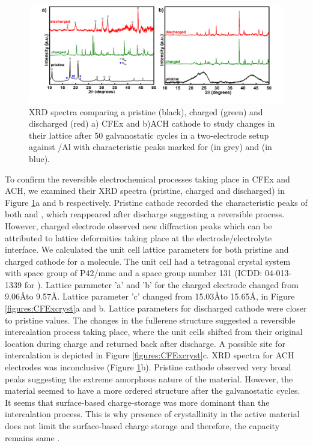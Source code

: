 \documentclass{article}
\begin{document}
\begin{figure}[tbh!]
  \centering
  \includegraphics[width=\textwidth]{figures/XRD}
    \caption{XRD spectra comparing a pristine (black), charged (green) and discharged (red) a) CFEx and b)ACH cathode to study changes in their lattice after 50 galvanostatic cycles in a two-electrode setup against /Al with characteristic peaks marked for  (in grey) and  (in blue).}
  \label{figures:XRD}
\end{figure}
To confirm the reversible electrochemical processes taking place in CFEx and ACH, we examined their XRD spectra (pristine, charged and discharged) in Figure \ref{figures:XRD}a and b respectively. Pristine cathode recorded the characteristic peaks of both  and , which reappeared after discharge suggesting a reversible process. However, charged electrode observed new diffraction peaks which can be attributed to lattice deformities taking place at the electrode/electrolyte interface. We calculated the unit cell lattice parameters for both pristine and charged cathode for a  molecule. The unit cell had a tetragonal crystal system with space group of P42/mmc and a space group number 131 (ICDD: 04-013-1339 for ). Lattice parameter 'a' and 'b' for the charged electrode changed from 9.06\AA to 9.57\AA . Lattice parameter 'c' changed from 15.03\AA to 15.65\AA, in Figure \ref{figures:CFExcryst}a and b. Lattice parameters for discharged cathode were closer to pristine values. The changes in the fullerene structure suggested a reversible intercalation process taking place, where the unit cells shifted from their original location during charge and returned back after discharge. A possible site for  intercalation is depicted in Figure \ref{figures:CFExcryst}c. XRD spectra for ACH electrodes was inconclusive (Figure \ref{figures:XRD}b). Pristine cathode observed very broad peaks suggesting the extreme amorphous nature of the material. However, the material seemed to have a more ordered structure after the galvanostatic cycles. It seems that surface-based charge-storage was more dominant than the intercalation process. This is why presence of crystallinity in the active material does not limit the surface-based charge storage and therefore, the capacity remains same \cite{kim_synthesis_2006, jow_factors_2018}. 
\end{document}
